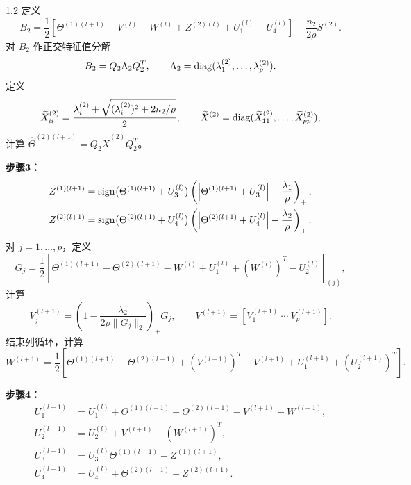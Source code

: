 \begin{bookalgorithm}{1.2}
定义
\[
B_2=\frac12\left[\Theta^{(1)(l+1)}-V^{(l)}-W^{(l)}+Z^{(2)(l)}+U_1^{(l)}-U_4^{(l)}\right]
-\frac{n_2}{2\rho}S^{(2)}.
\]
对 $B_2$ 作正交特征值分解
\[
B_2=Q_2\Lambda_2Q_2^T,\qquad \Lambda_2=\operatorname{diag}(\lambda_1^{(2)},\ldots,\lambda_p^{(2)}).
\]
定义
\[
\widetilde X_{ii}^{(2)}=\frac{\lambda_i^{(2)}+\sqrt{(\lambda_i^{(2)})^2+2n_2/\rho}}2,
\qquad \widetilde X^{(2)}=\operatorname{diag}(\widetilde X_{11}^{(2)},\ldots,\widetilde X_{pp}^{(2)}),
\]
计算 $\widehat\Theta^{(2)(l+1)}=Q_2\widetilde X^{(2)}Q_2^T$。

\textbf{步骤3：}
\[
\begin{aligned}
Z^{(1)(l+1)}&=\operatorname{sign}\bigl(\Theta^{(1)(l+1)}+U_3^{(l)}\bigr)
\left(\left|\Theta^{(1)(l+1)}+U_3^{(l)}\right|-\frac{\lambda_1}\rho\right)_+,\\
Z^{(2)(l+1)}&=\operatorname{sign}\bigl(\Theta^{(2)(l+1)}+U_4^{(l)}\bigr)
\left(\left|\Theta^{(2)(l+1)}+U_4^{(l)}\right|-\frac{\lambda_2}\rho\right)_+.
\end{aligned}
\]
对 $j=1,\ldots,p$，定义
\[
G_j=\frac12\left[\Theta^{(1)(l+1)}-\Theta^{(2)(l+1)}-W^{(l)}+U_1^{(l)}
+(W^{(l)})^T-U_2^{(l)}\right]_{(j)},
\]
计算
\[
V_j^{(l+1)}=\left(1-\frac{\lambda_2}{2\rho\|G_j\|_2}\right)_+G_j,
\qquad V^{(l+1)}=[V_1^{(l+1)}\ \cdots\ V_p^{(l+1)}].
\]
结束列循环，计算
\[
W^{(l+1)}=\frac12\left[\Theta^{(1)(l+1)}-\Theta^{(2)(l+1)}
+(V^{(l+1)})^T-V^{(l+1)}+U_1^{(l+1)}+(U_2^{(l+1)})^T\right].
\]

\textbf{步骤4：}
\[
\begin{aligned}
U_1^{(l+1)}&=U_1^{(l)}+\Theta^{(1)(l+1)}-\Theta^{(2)(l+1)}-V^{(l+1)}-W^{(l+1)},\\
U_2^{(l+1)}&=U_2^{(l)}+V^{(l+1)}-(W^{(l+1)})^T,\\
U_3^{(l+1)}&=U_3^{(l)}\Theta^{(1)(l+1)}-Z^{(1)(l+1)},\\
U_4^{(l+1)}&=U_4^{(l)}+\Theta^{(2)(l+1)}-Z^{(2)(l+1)}.
\end{aligned}
\]
\end{bookalgorithm}
